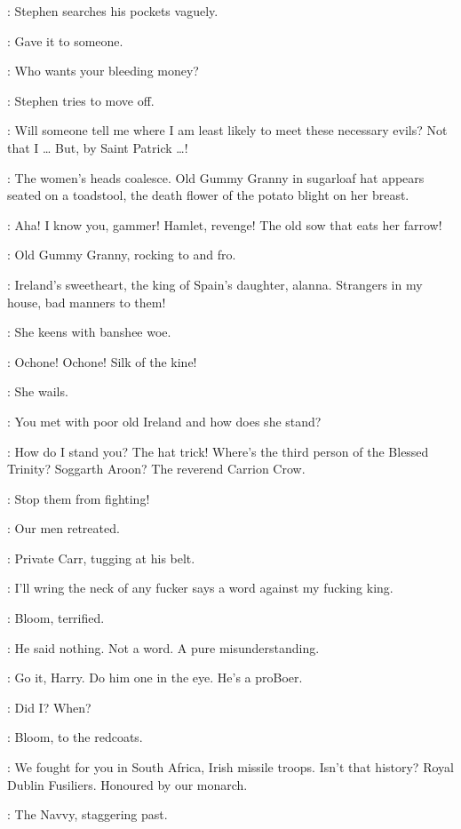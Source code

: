 :
Stephen searches his pockets vaguely.

\Stephen:
Gave it to someone.

\Carr:
Who wants your bleeding money?

:
Stephen tries to move off.

\Stephen:
Will someone tell me where I am least likely to meet these necessary evils?
Not that I \ldots
But, by Saint Patrick \ldots!

:
The women's heads coalesce.
Old Gummy Granny in sugarloaf hat appears seated on a toadstool,
the death flower of the potato blight on her breast.%

\Stephen:
Aha!
I know you, gammer!
Hamlet, revenge!
The old sow that eats her farrow!

:
Old Gummy Granny, rocking to and fro.

\GummyGranny:
Ireland's sweetheart, the king of Spain's daughter, alanna.
Strangers in my house, bad manners to them!

:
She keens with banshee woe.

\GummyGranny:
Ochone!
Ochone!
Silk of the kine!

:
She wails.

\GummyGranny:
You met with poor old Ireland and how does she stand?

\Stephen:
How do I stand you?
The hat trick!
Where's the third person of the Blessed Trinity?
Soggarth Aroon?
The reverend Carrion Crow.

\Cissy[2]:
Stop them from fighting!

\ARough[1]:
Our men retreated.

:
Private Carr, tugging at his belt.

\Carr:
I'll wring the neck of any fucker says a word against my fucking king.

:
Bloom, terrified.

\Bloom:
He said nothing.
Not a word.
A pure misunderstanding.

\Compton[2]:
Go it, Harry.
Do him one in the eye.
He's a proBoer.

\Stephen:
Did I?
When?

:
Bloom, to the redcoats.

\Bloom:
We fought for you in South Africa, Irish missile troops.
Isn't that history?
Royal Dublin Fusiliers.
Honoured by our monarch.

:
The Navvy, staggering past.

